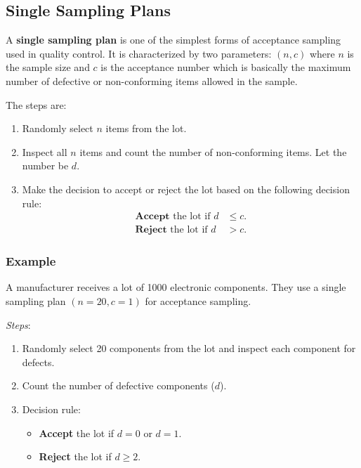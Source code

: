 \documentclass[twoside]{book}
\begin{document}
\subsection{Single Sampling Plans}

A \textbf{single sampling plan} is one of the simplest forms of acceptance sampling used in quality control. It is characterized by two parameters: $(n, c)$ where $n$ is the sample size and $c$ is the acceptance number which is basically the maximum number of defective or non-conforming items allowed in the sample.

The steps are:
\begin{textbox}
\begin{enumerate}
    \item Randomly select $n$ items from the lot.
    \item Inspect all $n$ items and count the number of non-conforming items. Let the number be $d$.
    \item Make the decision to accept or reject the lot based on the following decision rule:
    \begin{align*}
    \textbf{Accept} \text{ the lot if } d &\leq c. \\
    \textbf{Reject} \text{ the lot if } d &> c.
    \end{align*}
\end{enumerate}
\end{textbox}

\subsubsection{Example}

A manufacturer receives a lot of 1000 electronic components. They use a single sampling plan $(n=20, c=1)$ for acceptance sampling.

\textit{Steps}:
\begin{enumerate}
    \item Randomly select 20 components from the lot and inspect each component for defects.
    \item Count the number of defective components ($d$).
    \item Decision rule:
    \begin{itemize}
        \item  \textbf{Accept} the lot if $d = 0$ or $d = 1$.
        \item \textbf{Reject} the lot if $d \geq 2$.
    \end{itemize}
\end{enumerate}
\end{document}
